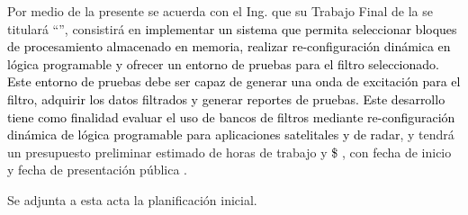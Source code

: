 \documentclass[
11pt, %
]{charter}
\begin{document}
Por medio de la presente se acuerda con el Ing. \authorname\hspace{1px} que su Trabajo Final de la \degreename\hspace{1px} se titulará ``\ttitle'', consistirá en \textcolor{black}{implementar un sistema que permita seleccionar bloques de procesamiento almacenado en memoria, realizar re-configuración dinámica en lógica programable y ofrecer un entorno de pruebas para el filtro seleccionado. Este entorno de pruebas debe ser capaz de generar una onda de excitación para el filtro, adquirir los datos filtrados y generar reportes de pruebas. Este desarrollo tiene como finalidad evaluar el uso de bancos de filtros mediante re-configuración dinámica de lógica programable para aplicaciones satelitales y de radar}, y tendrá un presupuesto preliminar estimado de \textcolor{black}{\projecteffort} horas de trabajo y \textcolor{black}{\$ \projectcost}, con fecha de inicio \fechaInicioName\hspace{1px} y fecha de presentación pública \fechaFinalName.

Se adjunta a esta acta la planificación inicial.

\vfill
\end{document}
